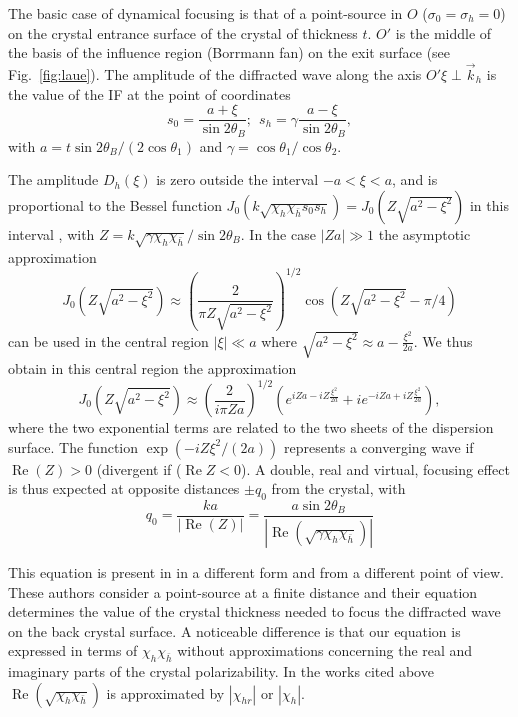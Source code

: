 \documentclass[preprint]{iucr}              %
\begin{document}
The basic case of dynamical focusing is that of a point-source in $O$ ($\sigma_0=\sigma_h=0$) on the crystal entrance surface of the crystal of thickness $t$.
$O'$ is the middle of the basis of the influence region (Borrmann fan) on the exit surface (see Fig.~\ref{fig:laue}).
The amplitude of the diffracted wave along the axis $O'\xi \perp \vec k_h$ is the value of the IF at the point of coordinates 
\begin{equation}
    \label{eq:s0andsh}
    s_0 = \frac{a+\xi}{\sin2\theta_B }  ; \:\: 
    s_h = \gamma\frac{a-\xi}{\sin2\theta_B},
\end{equation}
with $a=t \sin2\theta_B/(2\cos\theta_1)$ and $\gamma=\cos\theta_1/\cos\theta_2$. 

The amplitude $D_h(\xi)$ is zero outside the interval $-a<\xi<a$,
and is proportional to the Bessel function $J_0(k \sqrt{\chi_h \chi_{\bar h} s_0 s_h})=J_0(Z\sqrt{a^2-\xi^2})$ in this interval \cite{kato1961}, with  $Z=k\sqrt{\gamma\chi_h\chi_{\bar h}}/\sin2\theta_B$. In the case $|Z a| \gg 1$ the asymptotic approximation
\begin{equation}
    J_0(Z\sqrt{a^2-\xi^2})\approx \left(\frac{2}{\pi Z \sqrt{a^2-\xi^2}}\right)^{1/2} \cos(Z\sqrt{a^2-\xi^2}-\pi/4)
\end{equation}
can be used in the central region $|\xi|\ll a$ where $\sqrt{a^2-\xi^2} \approx a - \frac{\xi^2}{2a}$.
We thus obtain in this central region the approximation
\begin{equation}
\label{eq:approximatedDiffractedField}
    J_0(Z\sqrt{a^2-\xi^2})\approx \left(\frac{2}{i \pi Z a}\right)^{1/2} \left( e^{iZa-i Z\frac{ \xi^2}{2a}} + i 
    e^{-i Z a+i Z\frac{\xi^2}{2a}} \right),
\end{equation}
where the two exponential terms are related to the two sheets of the dispersion surface. 
The function $\exp(- i Z \xi^2 / (2 a))$ 
represents a converging wave if $\operatorname{Re}(Z)>0$ (divergent if  ($\operatorname{Re} Z <0$). A double, real and virtual, focusing effect is thus expected at opposite distances $\pm q_0$ from the crystal, with
\begin{equation}
\label{eq:q0}
    q_0 = \frac{k a}{|\operatorname{Re}(Z)|}= \frac{a \sin2\theta_B}{|\operatorname{Re}(\sqrt{\gamma\chi_h\chi_{\bar h}})|}
\end{equation}

This equation is present in \cite{Kohn2000, KohnGorobtsov2013} in a different form and from a different point of view. These authors consider a point-source at a finite distance and their equation determines the value of the crystal thickness needed to focus the diffracted wave on the back crystal surface. A noticeable difference is that our equation is expressed in terms of $\chi_h \chi_{\bar h}$ without approximations  concerning the real and imaginary parts of the crystal polarizability. In the works cited above $\operatorname{Re} (\sqrt{\chi_h \chi_{\bar h}})$ is approximated by $|\chi_{hr}|$ or $|\chi_h|$.
\end{document}

